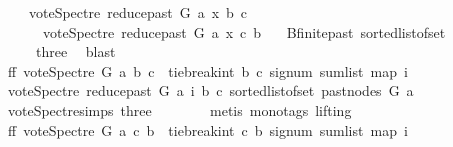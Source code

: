 \begin{isabellebody}
\ \ \ \ vote{\isacharunderscore}{\kern0pt}Spectre\ {\isacharparenleft}{\kern0pt}reduce{\isacharunderscore}{\kern0pt}past\ G\ a{\isacharparenright}{\kern0pt}\ x\ b\ c\ \isanewline
\ \ \ \ {\isacharequal}{\kern0pt}\ {\isacharminus}{\kern0pt}\ vote{\isacharunderscore}{\kern0pt}Spectre\ {\isacharparenleft}{\kern0pt}reduce{\isacharunderscore}{\kern0pt}past\ G\ a{\isacharparenright}{\kern0pt}\ x\ c\ b{\isachardoublequoteclose}\ \isamarkupfalse%
\ {}{\isacharparenleft}{\kern0pt}{}{\isacharparenright}{\kern0pt}\ B{}{\isachardot}{\kern0pt}finite{\isacharunderscore}{\kern0pt}past\ sorted{\isacharunderscore}{\kern0pt}list{\isacharunderscore}{\kern0pt}of{\isacharunderscore}{\kern0pt}set{\isacharparenleft}{\kern0pt}{}{\isacharparenright}{\kern0pt}\isanewline
\ \ \ \ \ three\ \isamarkupfalse%
\ blast\isanewline
\ \ \ \ \isamarkupfalse%
\ \isamarkupfalse%
\ ff{\isacharcolon}{\kern0pt}\ {\isachardoublequoteopen}vote{\isacharunderscore}{\kern0pt}Spectre\ G\ a\ b\ c\ {\isacharequal}{\kern0pt}\ tie{\isacharunderscore}{\kern0pt}break{\isacharunderscore}{\kern0pt}int\ b\ c\ {\isacharparenleft}{\kern0pt}signum\ {\isacharparenleft}{\kern0pt}sum{\isacharunderscore}{\kern0pt}list\ {\isacharparenleft}{\kern0pt}map\ {\isacharparenleft}{\kern0pt}{\isasymlambda}i{\isachardot}{\kern0pt}\isanewline
\ {\isacharparenleft}{\kern0pt}vote{\isacharunderscore}{\kern0pt}Spectre\ {\isacharparenleft}{\kern0pt}reduce{\isacharunderscore}{\kern0pt}past\ G\ a{\isacharparenright}{\kern0pt}\ i\ b\ c{\isacharparenright}{\kern0pt}{\isacharparenright}{\kern0pt}\ {\isacharparenleft}{\kern0pt}sorted{\isacharunderscore}{\kern0pt}list{\isacharunderscore}{\kern0pt}of{\isacharunderscore}{\kern0pt}set\ {\isacharparenleft}{\kern0pt}past{\isacharunderscore}{\kern0pt}nodes\ G\ a{\isacharparenright}{\kern0pt}{\isacharparenright}{\kern0pt}{\isacharparenright}{\kern0pt}{\isacharparenright}{\kern0pt}{\isacharparenright}{\kern0pt}{\isachardoublequoteclose}\isanewline
\ \ \ \ \ \ \isamarkupfalse%
\ vote{\isacharunderscore}{\kern0pt}Spectre{\isachardot}{\kern0pt}simps\ three\isanewline
\ \ \ \ \ \ \isamarkupfalse%
\ {\isacharparenleft}{\kern0pt}metis\ {\isacharparenleft}{\kern0pt}mono{\isacharunderscore}{\kern0pt}tags{\isacharcomma}{\kern0pt}\ lifting{\isacharparenright}{\kern0pt}{\isacharparenright}{\kern0pt}\ \isanewline
\ \ \ \ \isamarkupfalse%
\ ff{}{\isacharcolon}{\kern0pt}\ {\isachardoublequoteopen}vote{\isacharunderscore}{\kern0pt}Spectre\ G\ a\ c\ b\ {\isacharequal}{\kern0pt}\ tie{\isacharunderscore}{\kern0pt}break{\isacharunderscore}{\kern0pt}int\ c\ b\ {\isacharparenleft}{\kern0pt}signum\ {\isacharparenleft}{\kern0pt}sum{\isacharunderscore}{\kern0pt}list\ {\isacharparenleft}{\kern0pt}map\ {\isacharparenleft}{\kern0pt}{\isasymlambda}i{\isachardot}{\kern0pt}\isanewline

\end{isabellebody}

